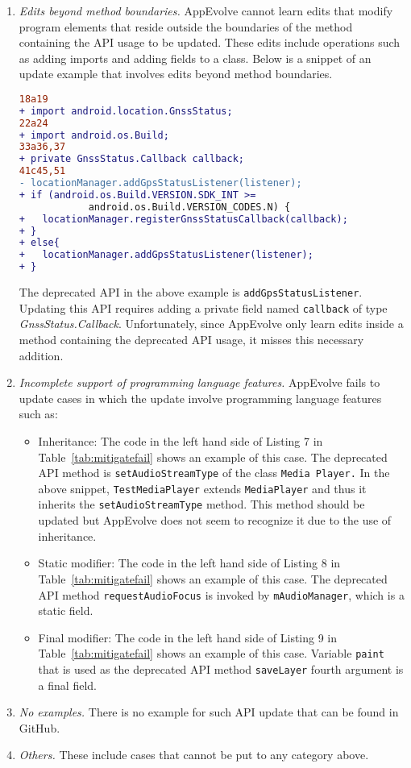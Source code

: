 \begin{enumerate}

\item {\em Edits beyond method boundaries.} AppEvolve cannot learn edits that modify program elements that reside outside the boundaries of the method containing the API usage to be updated. These edits include operations such as adding imports and adding fields to a class. Below is a snippet of an update example that involves edits beyond method boundaries.
\begin{lstlisting}[language=diff,numbers=none]
18a19
+ import android.location.GnssStatus;
22a24
+ import android.os.Build;
33a36,37
+ private GnssStatus.Callback callback;
41c45,51
- locationManager.addGpsStatusListener(listener);
+ if (android.os.Build.VERSION.SDK_INT >= 
            android.os.Build.VERSION_CODES.N) {
+   locationManager.registerGnssStatusCallback(callback);
+ }
+ else{
+   locationManager.addGpsStatusListener(listener);
+ }
\end{lstlisting}
The deprecated API in the above example is {\tt addGpsStatusListener}. Updating this API requires adding a private field named {\tt callback} of type {\em GnssStatus.Callback}. Unfortunately, since AppEvolve only learn edits inside a method containing the deprecated API usage, it misses this necessary addition.

\item {\em Incomplete support of programming language features.} AppEvolve fails to update cases in which the update involve programming language features such as:
\begin{itemize}
\item Inheritance: The code in the left hand side of Listing 7 in Table~\ref{tab:mitigatefail} shows an example of this case.  The deprecated API method is {\tt setAudioStreamType} of the class {\tt Media Player.} In the above snippet, {\tt TestMediaPlayer} extends {\tt MediaPlayer} and thus it inherits the {\tt setAudioStreamType} method. This method should be updated but AppEvolve does not seem to recognize it due to the use of inheritance.
\item Static modifier:  The code in the left hand side of Listing 8 in Table~\ref{tab:mitigatefail} shows an example of this case.  The deprecated API method {\tt requestAudioFocus} is invoked by {\tt mAudioManager}, which is a static field.

\item Final modifier: The code in the left hand side of Listing 9 in Table~\ref{tab:mitigatefail} shows an example of this case.  Variable {\tt paint} that is used as the deprecated API method {\tt saveLayer} fourth argument is a final field.

\end{itemize}

\item {\em No examples.} There is no example for such API update that can be found in GitHub. 

\item {\em Others.} These include cases that cannot be put to any category above.
\end{enumerate}


